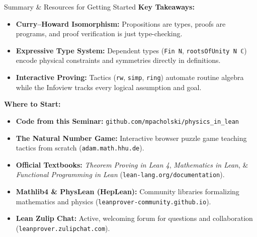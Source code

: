 \documentclass[aspectratio=169, 10pt]{beamer}
\begin{document}
\begin{frame}{Summary \& Resources for Getting Started}
  \textbf{Key Takeaways:}
  \begin{itemize}
    \item \textbf{Curry--Howard Isomorphism:} Propositions are types, proofs are programs, and proof verification is just type-checking.
    \item \textbf{Expressive Type System:} Dependent types (\texttt{Fin N}, \texttt{rootsOfUnity N ℂ}) encode physical constraints and symmetries directly in definitions.
    \item \textbf{Interactive Proving:} Tactics (\texttt{rw}, \texttt{simp}, \texttt{ring}) automate routine algebra while the Infoview tracks every logical assumption and goal.
  \end{itemize}

  \vspace{0.15cm}
  \textbf{Where to Start:}
  \begin{itemize}
    \item \textbf{Code from this Seminar:} \texttt{github.com/mpacholski/physics\_in\_lean}
    \item \textbf{The Natural Number Game:} Interactive browser puzzle game teaching tactics from scratch (\texttt{adam.math.hhu.de}).
    \item \textbf{Official Textbooks:} \emph{Theorem Proving in Lean 4}, \emph{Mathematics in Lean}, \& \emph{Functional Programming in Lean} (\texttt{lean-lang.org/documentation}).
    \item \textbf{Mathlib4 \& PhysLean (HepLean):} Community libraries formalizing mathematics and physics (\texttt{leanprover-community.github.io}).
    \item \textbf{Lean Zulip Chat:} Active, welcoming forum for questions and collaboration (\texttt{leanprover.zulipchat.com}).
  \end{itemize}
\end{frame}
\end{document}
